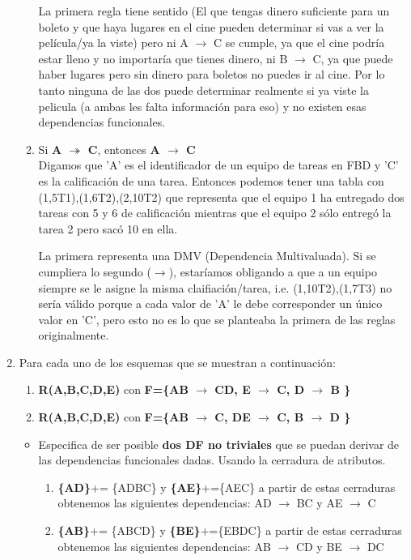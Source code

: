 \documentclass{article}
\begin{document}
\begin{enumerate}
\begin{enumerate}
    	La primera regla tiene sentido (El que tengas dinero suficiente para un boleto y que haya lugares en el cine
    	pueden determinar si vas a ver la película/ya la viste) pero ni A $\rightarrow$ C se cumple, ya que el cine 
    	podría estar lleno y no importaría que tienes dinero, ni B $\rightarrow$ C, ya que puede haber lugares pero
    	sin dinero para boletos no puedes ir al cine. Por lo tanto ninguna de las dos puede determinar realmente si
    	ya viste la pelicula (a ambas les falta información para eso) y no existen esas dependencias funcionales.
    	
    	\item Si \textbf{A $\twoheadrightarrow$ C}, entonces \textbf{A $\rightarrow$ C}\\
    	Digamos que 'A' es el identificador de un equipo de tareas en FBD y 'C' es la calificación de una tarea. Entonces
    	podemos tener una tabla con (1,5T1),(1,6T2),(2,10T2) que representa que el equipo 1 ha entregado dos tareas con 5 
    	y 6 de calificación mientras que el equipo 2 sólo entregó la tarea 2 pero sacó 10 en ella.
    	
    	La primera representa una DMV (Dependencia Multivaluada). Si se cumpliera lo segundo ($\rightarrow$), estaríamos 
    	obligando a que a un equipo siempre se le asigne la misma claifiación/tarea, i.e. (1,10T2),(1,7T3) no sería válido
    	porque a cada valor de 'A' le debe corresponder un único valor en 'C', pero esto no es lo que se planteaba la
    	primera de las reglas originalmente.
    	
    \end{enumerate}
       
    \item Para cada uno de los esquemas que se muestran a continuación:
    
    \begin{enumerate}
    	\item \textbf{R(A,B,C,D,E)} con \textbf{F=\{AB $\rightarrow$ CD, E $\rightarrow$ C, D $\rightarrow$ B \}}
    	\item \textbf{R(A,B,C,D,E)}  con \textbf{F=\{AB $\rightarrow$ C, DE $\rightarrow$ C, B $\rightarrow$ D \}}
    \end{enumerate}   

\begin{itemize}
	\item Especifica  de ser posible \textbf{dos DF no triviales} que se puedan derivar de las dependencias funcionales dadas.
	Usando la cerradura de atributos.
	\begin{enumerate}
		\item \textbf{\{AD\}}+= \{ADBC\} y \textbf{\{AE\}}+=\{AEC\} a partir de estas cerraduras obtenemos las siguientes dependencias: AD $\rightarrow$ BC y AE $\rightarrow$ C\\ 
		\item \textbf{\{AB\}}+= \{ABCD\} y \textbf{\{BE\}}+=\{EBDC\} a partir de estas cerraduras obtenemos las siguientes dependencias: AB $\rightarrow$ CD y BE $\rightarrow$ DC\\ 
		 

\end{enumerate}
\end{itemize}
\end{enumerate}
\end{document}
